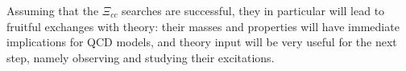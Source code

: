 Assuming that the $\Xi_{cc}$
searches are successful, they in particular will lead to fruitful
exchanges with theory: their masses and properties will have
immediate implications for QCD models, and theory input will be
very useful for the next step, namely observing and studying their
excitations.




